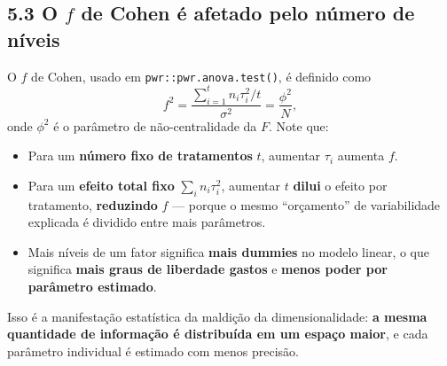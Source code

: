 \documentclass[
]{article}
\providecommand{\tightlist}{%
  \setlength{\itemsep}{0pt}\setlength{\parskip}{0pt}}
\begin{document}
\subsection{\texorpdfstring{5.3 O \(f\) de Cohen é afetado pelo número
de
níveis}{5.3 O f de Cohen é afetado pelo número de níveis}}\label{o-f-de-cohen-uxe9-afetado-pelo-nuxfamero-de-nuxedveis}

O \(f\) de Cohen, usado em \texttt{pwr::pwr.anova.test()}, é definido
como
\[f^2 = \frac{\sum_{i=1}^{t} n_i \tau_i^2 / t}{\sigma^2} = \frac{\phi^2}{N},\]
onde \(\phi^2\) é o parâmetro de não-centralidade da \(F\). Note que:

\begin{itemize}
\tightlist
\item
  Para um \textbf{número fixo de tratamentos} \(t\), aumentar \(\tau_i\)
  aumenta \(f\).
\item
  Para um \textbf{efeito total fixo} \(\sum_i n_i \tau_i^2\), aumentar
  \(t\) \textbf{dilui} o efeito por tratamento, \textbf{reduzindo} \(f\)
  --- porque o mesmo ``orçamento'' de variabilidade explicada é dividido
  entre mais parâmetros.
\item
  Mais níveis de um fator significa \textbf{mais dummies} no modelo
  linear, o que significa \textbf{mais graus de liberdade gastos} e
  \textbf{menos poder por parâmetro estimado}.
\end{itemize}

Isso é a manifestação estatística da maldição da dimensionalidade:
\textbf{a mesma quantidade de informação é distribuída em um espaço
maior}, e cada parâmetro individual é estimado com menos precisão.
\end{document}
